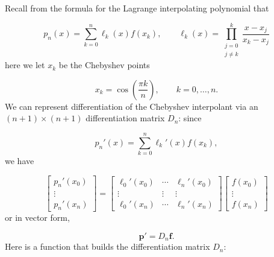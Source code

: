 \documentclass[12pt,a4paper]{article}
\begin{document}
Recall from the formula for the Lagrange interpolating polynomial that

\[
p_n(x) = \sum_{k = 0}^{n}\ell_k(x)f(x_k), \qquad \ell_k(x) = \prod_{\substack{j=0\\ j \neq k}}^{k}\frac{x-x_j}{x_k-x_j}
\]
here we let $x_k$ be the Chebyshev points 

\[
x_k = \cos\left(\frac{\pi k}{n} \right), \qquad k = 0, \ldots, n.
\]
We can represent differentiation of the Chebyshev interpolant via an $(n+1) \times (n+1)$ differentiation matrix $D_n$: since

\[
p_n'(x) = \sum_{k = 0}^{n}\ell_k'(x)f(x_k),
\]
we have

\[
\begin{bmatrix}
p_n'(x_0) \\
\vdots \\
p_n'(x_n)
\end{bmatrix} = 
\begin{bmatrix}
\ell_0'(x_0) & \cdots & \ell_n'(x_0) \\
\vdots & \vdots  & \vdots \\
\ell_0'(x_n) & \cdots & \ell_n'(x_n)
\end{bmatrix}
\begin{bmatrix}
f(x_0) \\
\vdots \\
f(x_n)
\end{bmatrix}
\]
or in vector form,

\[
\mathbf{p}' = D_n \mathbf{f}.
\]
Here is a function that builds the differentiation matrix $D_n$:
\end{document}
